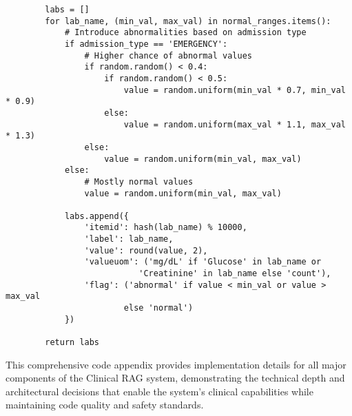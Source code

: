 \begin{verbatim}
        labs = []
        for lab_name, (min_val, max_val) in normal_ranges.items():
            # Introduce abnormalities based on admission type
            if admission_type == 'EMERGENCY':
                # Higher chance of abnormal values
                if random.random() < 0.4:
                    if random.random() < 0.5:
                        value = random.uniform(min_val * 0.7, min_val * 0.9)
                    else:
                        value = random.uniform(max_val * 1.1, max_val * 1.3)
                else:
                    value = random.uniform(min_val, max_val)
            else:
                # Mostly normal values
                value = random.uniform(min_val, max_val)
            
            labs.append({
                'itemid': hash(lab_name) % 10000,
                'label': lab_name,
                'value': round(value, 2),
                'valueuom': ('mg/dL' if 'Glucose' in lab_name or 
                           'Creatinine' in lab_name else 'count'),
                'flag': ('abnormal' if value < min_val or value > max_val 
                        else 'normal')
            })
        
        return labs
\end{verbatim}

This comprehensive code appendix provides implementation details for all major components of the Clinical RAG system, demonstrating the technical depth and architectural decisions that enable the system's clinical capabilities while maintaining code quality and safety standards.